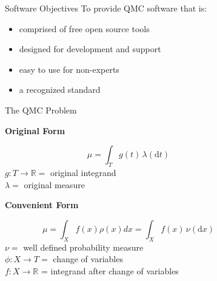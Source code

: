 \documentclass[final]{beamer}
\newcommand{\bfCenter}[1]{\centerline{\textbf{#1}}}
\newlength{\sepwid}
\newlength{\onecolwid}
\newlength{\threecolwid}
\newcommand{\dif}{\mathrm{d}}
\begin{document}
\setlength{\belowcaptionskip}{2ex}
\setlength\belowdisplayshortskip{2ex}
\begin{frame}[t]
\vspace{-2ex}
\begin{columns}[t]

\begin{column}{\sepwid}\end{column}
\begin{column}{\threecolwid}
\begin{columns}[t,totalwidth=\threecolwid]  

\begin{column}{\onecolwid}\vspace{-1in}
\begin{block}{Software Objectives}
    To provide QMC software that is: 
    \begin{itemize}
        \item comprised of free open source tools
        \item designed for development and support 
        \item easy to use for non-experts
        \item a recognized standard
    \end{itemize}
\end{block}

\vspace{-2ex}
\begin{block}{The QMC Problem}

    \bfCenter{Original Form} 
        \begin{equation*}
            \mu = \int_{T} g(t) \, \lambda(\dif t) 
            \label{eq:ogProblem}
        \end{equation*}
        $ g:T \rightarrow \mathbb{R} = $ original integrand \\
        $ \lambda = $ original measure

    \vspace{2ex}
    \bfCenter{Convenient Form}
        \begin{equation*}
            \mu = \int_{X} f(x)\rho(x)dx = \int_{X} f(x) \, \nu( \dif x)
            \label{convForm}
        \end{equation*}
        $\nu = $ well defined probability measure\\
        $\phi: X \rightarrow T = $ change of variables\\
        $f: X \rightarrow \mathbb{R} $ = integrand after change of variables
        

\end{block}
\end{column}
\end{columns}
\end{column}
\end{columns}
\end{frame}
\end{document}
